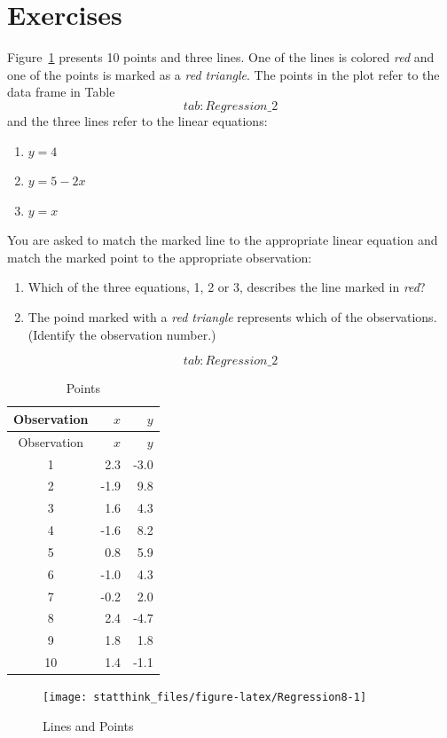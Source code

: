 \documentclass[]{krantz}
\theoremstyle{definition}
\theoremstyle{definition}
\theoremstyle{definition}
\theoremstyle{remark}
\let\BeginKnitrBlock\begin \let\EndKnitrBlock\end
\begin{document}
\hypertarget{exercises-9}{%
\section{Exercises}\label{exercises-9}}

\BeginKnitrBlock{exercise}
\protect\hypertarget{exr:unnamed-chunk-219}{}{\label{exr:unnamed-chunk-219} }Figure~\ref{fig:Regression8} presents 10 points and
three lines. One of the lines is colored \emph{red} and one of the points is
marked as a \emph{red triangle}. The points in the plot refer to the data
frame in Table~\[tab:Regression\_2\] and the three lines refer to the
linear equations:

\begin{enumerate}
\def\labelenumi{\arabic{enumi}.}
\item
  \(y = 4\)
\item
  \(y = 5 - 2x\)
\item
  \(y = x\)
\end{enumerate}

You are asked to match the marked line to the appropriate linear
equation and match the marked point to the appropriate observation:

\begin{enumerate}
\def\labelenumi{\arabic{enumi}.}
\item
  Which of the three equations, 1, 2 or 3, describes the line marked
  in \emph{red}?
\item
  The poind marked with a \emph{red triangle} represents which of the
  observations. (Identify the observation number.)
\end{enumerate}

\[tab:Regression\_2\]

\begin{longtable}[]{@{}crr@{}}
\caption{Points}\tabularnewline
\toprule
Observation & \(x\) & \(y\)\tabularnewline
\midrule
\endfirsthead
\toprule
Observation & \(x\) & \(y\)\tabularnewline
\midrule
\endhead
1 & 2.3 & -3.0\tabularnewline
2 & -1.9 & 9.8\tabularnewline
3 & 1.6 & 4.3\tabularnewline
4 & -1.6 & 8.2\tabularnewline
5 & 0.8 & 5.9\tabularnewline
6 & -1.0 & 4.3\tabularnewline
7 & -0.2 & 2.0\tabularnewline
8 & 2.4 & -4.7\tabularnewline
9 & 1.8 & 1.8\tabularnewline
10 & 1.4 & -1.1\tabularnewline
\bottomrule
\end{longtable}
\EndKnitrBlock{exercise}

\begin{figure}

{\centering \texttt{[image: statthink\_files/figure-latex/Regression8-1]} 

}

\caption{Lines and Points}\label{fig:Regression8}
\end{figure}
\end{document}
